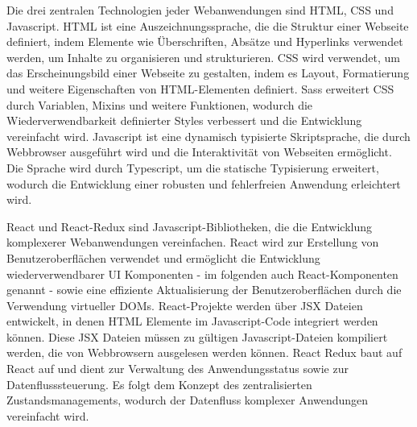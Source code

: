 Die drei zentralen Technologien jeder Webanwendungen sind \ac{HTML}, \ac{CSS} und Javascript. HTML ist eine Auszeichnungssprache, die die Struktur einer Webseite definiert, indem Elemente wie Überschriften, Absätze und Hyperlinks verwendet werden, um Inhalte zu organisieren und strukturieren. \ac{CSS} wird verwendet, um das Erscheinungsbild einer Webseite zu gestalten, indem es Layout, Formatierung und weitere Eigenschaften von \ac{HTML}-Elementen definiert. \ac{Sass} erweitert \ac{CSS} durch Variablen, Mixins und weitere Funktionen, wodurch die Wiederverwendbarkeit definierter Styles verbessert und die Entwicklung vereinfacht wird. Javascript ist eine dynamisch typisierte Skriptsprache, die durch Webbrowser ausgeführt wird und die Interaktivität von Webseiten ermöglicht. Die Sprache wird durch Typescript, um die statische Typisierung erweitert, wodurch die Entwicklung einer robusten und fehlerfreien Anwendung erleichtert wird.

React und React-Redux sind Javascript-Bibliotheken, die die Entwicklung komplexerer Webanwendungen vereinfachen. React wird zur Erstellung von Benutzeroberflächen verwendet und ermöglicht die Entwicklung wiederverwendbarer \ac{UI} Komponenten - im folgenden auch React-Komponenten genannt - sowie eine effiziente Aktualisierung der Benutzeroberflächen durch die Verwendung virtueller \gls{DOM}s. React-Projekte werden über \ac{JSX} Dateien entwickelt, in denen \ac{HTML} Elemente im Javascript-Code integriert werden können. Diese \ac{JSX} Dateien müssen zu gültigen Javascript-Dateien kompiliert werden, die von Webbrowsern ausgelesen werden können. React Redux baut auf React auf und dient zur Verwaltung des Anwendungsstatus sowie zur Datenflusssteuerung. Es folgt dem Konzept des zentralisierten Zustandsmanagements, wodurch der Datenfluss komplexer Anwendungen vereinfacht wird.


